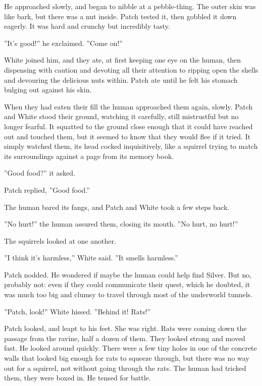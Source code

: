 \documentclass[11pt]{article}
\begin{document}
 He approached slowly, and began to nibble at a pebble-thing. The outer skin was like bark, but there was a nut inside. Patch tested it, then gobbled it down eagerly. It was hard and crunchy but incredibly tasty.\par
 ''It's good!'' he exclaimed. ''Come on!''\par
 White joined him, and they ate, at first keeping one eye on the human, then dispensing with caution and devoting all their attention to ripping open the shells and devouring the delicious nuts within. Patch ate until he felt his stomach bulging out against his skin.\par
 When they had eaten their fill the human approached them again, slowly. Patch and White stood their ground, watching it carefully, still mistrustful but no longer fearful. It squatted to the ground close enough that it could have reached out and touched them, but it seemed to know that they would flee if it tried. It simply watched them, its head cocked inquisitively, like a squirrel trying to match its surroundings against a page from its memory book.\par
 ''Good food?'' it asked.\par
 Patch replied, ''Good food.''\par
 The human bared its fangs, and Patch and White took a few steps back.\par
 ''No hurt!'' the human assured them, closing its mouth. ''No hurt, no hurt!''\par
 The squirrels looked at one another.\par
 ''I think it's harmless,'' White said. ''It smells harmless.''\par
 Patch nodded. He wondered if maybe the human could help find Silver. But no, probably not: even if they could communicate their quest, which he doubted, it was much too big and clumsy to travel through most of the underworld tunnels.\par
 ''Patch, look!'' White hissed. ''Behind it! Rats!''\par
 Patch looked, and leapt to his feet. She was right. Rats were coming down the passage from the ravine, half a dozen of them. They looked strong and moved fast. He looked around quickly. There were a few tiny holes in one of the concrete walls that looked big enough for rats to squeeze through, but there was no way out for a squirrel, not without going through the rats. The human had tricked them, they were boxed in. He tensed for battle.\par
\par
\end{document}
